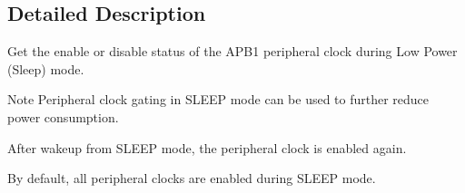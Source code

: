\subsection{Detailed Description}
Get the enable or disable status of the A\+P\+B1 peripheral clock during Low Power (Sleep) mode. 

\begin{DoxyNote}{Note}
Peripheral clock gating in S\+L\+E\+EP mode can be used to further reduce power consumption. 

After wakeup from S\+L\+E\+EP mode, the peripheral clock is enabled again. 

By default, all peripheral clocks are enabled during S\+L\+E\+EP mode. 
\end{DoxyNote}
